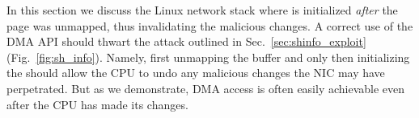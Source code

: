 In this section we discuss the Linux network stack where \shinfo is initialized \emph{after} the page was unmapped, thus invalidating the malicious changes.
A correct use of the DMA API should thwart the attack outlined in Sec.~\ref{sec:shinfo_exploit} (Fig.~\ref{fig:sh_info}). Namely, first unmapping the buffer and only then initializing the \shinfo{} should allow the CPU to undo any malicious changes the NIC may have perpetrated. But as we demonstrate, DMA access is often easily achievable even after the CPU has made its changes.



